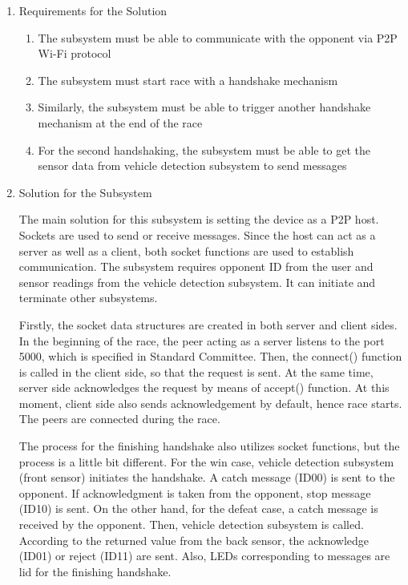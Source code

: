 \documentclass[a4paper,12pt]{article}
\begin{document}
		\begin{enumerate}
			\item {Requirements for the Solution}
			\begin{enumerate}
				\item The subsystem must be able to communicate with the opponent via P2P Wi-Fi protocol
				\item The subsystem must start race with a handshake mechanism
				\item Similarly, the subsystem must be able to trigger another handshake mechanism at the end of the race
				\item For the second handshaking, the subsystem must be able to get the sensor data from vehicle detection subsystem to send messages
			\end{enumerate}
			\item {Solution for the Subsystem}
			
		The main solution for this subsystem is setting the device as a P2P host. Sockets are used to send or receive messages.  Since the host can act as a server as well as a client, both socket functions are used to establish communication. The subsystem requires opponent ID from the user and sensor readings from the vehicle detection subsystem. It can initiate and terminate other subsystems.
		
		Firstly, the socket data structures are created in both server and client sides. In the beginning of the race, the peer acting as a server listens to the port 5000, which is specified in Standard Committee. Then, the connect() function is called in the client side, so that the request is sent. At the same time, server side acknowledges the request by means of accept() function. At this moment, client side also sends acknowledgement by default, hence race starts. The peers are connected during the race.
		
		The process for the finishing handshake also utilizes socket functions, but the process is a little bit different. For the win case, vehicle detection subsystem (front sensor) initiates the handshake. A catch message (ID00) is sent to the opponent. If acknowledgment is taken from the opponent, stop message (ID10) is sent. On the other hand, for the defeat case, a catch message is received by the opponent. Then, vehicle detection subsystem is called. According to the returned value from the back sensor, the acknowledge (ID01) or reject (ID11) are sent. Also, LEDs corresponding to messages are lid for the finishing handshake.
			

\end{enumerate}
\end{document}
